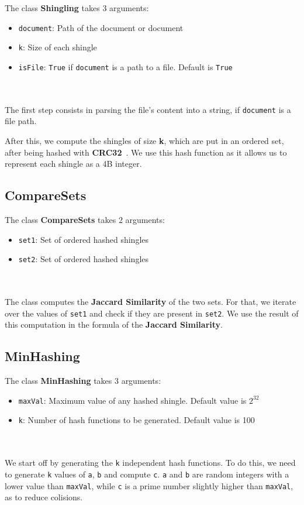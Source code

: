 \documentclass[]{article}
\begin{document}
The class \textbf{Shingling} takes 3 arguments:
\begin{itemize}
  \item \texttt{document}: Path of the document or document
  \item \texttt{k}: Size of each shingle
  \item \texttt{isFile}: \texttt{True} if \texttt{document} is a path to a file. Default is \texttt{True}
\end{itemize}
\\
\\
The first step consists in parsing the file's content into a string, if \texttt{document} is a file path.

After this, we compute the shingles of size \textbf{k}, which are put in an ordered set, after being hashed with \textbf{CRC32}~\cite{crc32}. We use this hash function as it allows us to represent each shingle as a 4B integer.

\subsection{CompareSets}
\label{sec:cs}

The class \textbf{CompareSets} takes 2 arguments:
\begin{itemize}
  \item \texttt{set1}: Set of ordered hashed shingles
  \item \texttt{set2}: Set of ordered hashed shingles
\end{itemize}
\\
\\
The class computes the \textbf{Jaccard Similarity} of the two sets. For that, we iterate over the values of \texttt{set1} and check if they are present in \texttt{set2}. We use the result of this computation in the formula of the \textbf{Jaccard Similarity}.

\subsection{MinHashing}

The class \textbf{MinHashing} takes 3 arguments:
\begin{itemize}
    \item \texttt{maxVal}: Maximum value of any hashed shingle. Default value is $2^{32}$
    \item \texttt{k}: Number of hash functions to be generated. Default value is 100
\end{itemize}
\\
\\
We start off by generating the \texttt{k} independent hash functions. To do this, we need to generate \texttt{k} values of \texttt{a}, \texttt{b} and compute \texttt{c}. \texttt{a} and \texttt{b} are random integers with a lower value than \texttt{maxVal}, while \texttt{c} is a prime number slightly higher than \texttt{maxVal}, as to reduce colisions.
\end{document}
